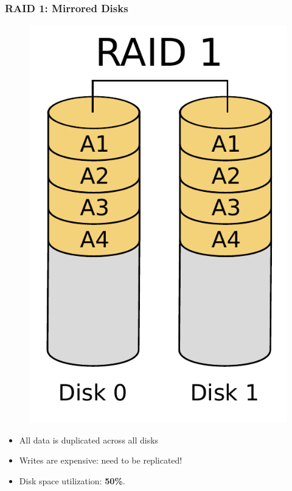 \documentclass{beamer}
\begin{document}
\begin{frame}
    \frametitle{RAID 1: Mirrored Disks}
    \begin{figure}
    \includegraphics[height=0.3\paperwidth]{RAID1.pdf}
    \end{figure}
    \begin{itemize}
        \item All data is duplicated across all disks \pause
        \item Writes are expensive: need to be replicated! \pause
        \item Disk space utilization: \textbf{50\%}.
    \end{itemize}
\end{frame}
\end{document}
